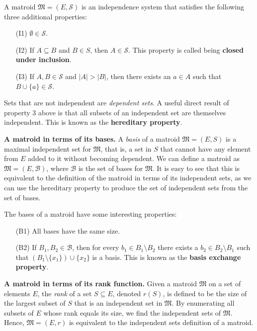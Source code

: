 A matroid $\mathfrak{M} = (E, \mathcal{S})$ is an independence system that satisfies the following three additional properties:

\begin{enumerate}[align=left]
  \item [(I1)] $\emptyset \in \mathcal{S}$.
  \item [(I2)] If $A \subseteq B$ and $B \in S$, then $A \in \mathcal{S}$. This property is called being \textbf{closed under inclusion}.
  \item [(I3)] If $A,B \in \mathcal{S}$ and $|A| > |B|$, then there exists an $a \in A$ such that $B \cup \{a\} \in \mathcal{S}$.
\end{enumerate}

Sets that are not independent are \textit{dependent sets}. A useful direct result of property 3 above is that all subsets of an independent set are themselves independent. This is known as the \textbf{hereditary property}.



\textbf{A matroid in terms of its bases.} A \textit{basis} of a matroid $\mathfrak{M} = (E,S)$ is a maximal independent set for $\mathfrak{M}$, that is, a set in $S$ that cannot have any element from $E$ added to it without becoming dependent. We can define a matroid as $\mathfrak{M} = (E, \mathcal{B})$, where $\mathcal{B}$ is the set of bases for $\mathfrak{M}$. It is easy to see that this is equivalent to the definition of the matroid in terms of its independent sets, as we can use the hereditary property to produce the set of independent sets from the set of bases.

The bases of a matroid have some interesting properties:

\begin{enumerate}[align=left]
  \item [(B1)] All bases have the same size.
  \item [(B2)] If $B_1, B_2 \in \mathcal{B}$, then for every $b_1 \in B_1 \setminus B_2$ there exists a $b_2 \in B_2 \setminus B_1$ such that $(B_1 \setminus \{x_1\}) \cup \{x_2\}$ is a basis. This is known as the \textbf{basis exchange property}.
\end{enumerate}



\textbf{A matroid in terms of its rank function.} Given a matroid $\mathfrak{M}$ on a set of elements $E$, the \textit{rank} of a set $S \subseteq E$, denoted $r(S)$, is defined to be the size of the largest subset of $S$ that is an independent set in $\mathfrak{M}$. By enumerating all subsets of $E$ whose rank equals its size, we find the independent sets of $\mathfrak{M}$. Hence, $\mathfrak{M} = (E, r)$ is equivalent to the independent sets definition of a matroid.

